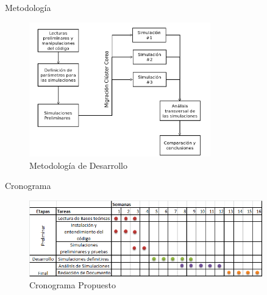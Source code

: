 \documentclass{beamer}
\begin{document}
\begin{frame}{Metodología}
	\begin{figure}
		\centering
		\includegraphics[width=0.7\textwidth]{im/Metodo}
		\caption{Metodología de Desarrollo}
		\label{fig:meto}
	\end{figure}

\end{frame}
	\begin{frame}{Cronograma}
	\centering
	\begin{figure}%
		\includegraphics[width=0.9\textwidth]{im/cronograma.png}%
		\caption{Cronograma Propuesto}%
		\label{fig:crono}%
	\end{figure}
			
	\end{frame}

\end{document}
